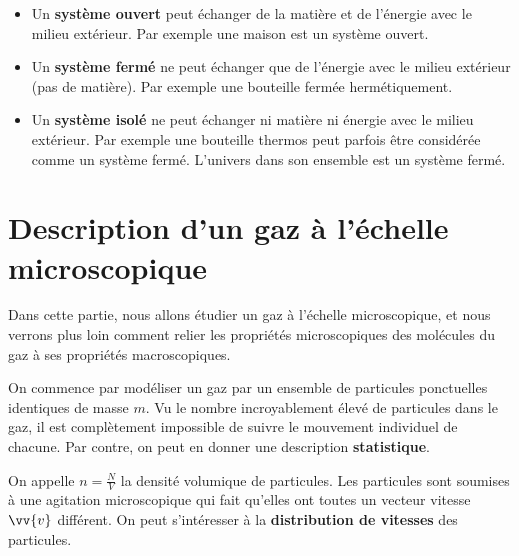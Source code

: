 \documentclass{cours}
\begin{document}
\begin{center}
\end{center}


\begin{itemize}
  \item Un \textbf{système ouvert} peut échanger de la matière et de l'énergie avec le milieu extérieur. Par exemple une maison est un système ouvert.
  \item Un \textbf{système fermé} ne peut échanger que de l'énergie avec le milieu extérieur (pas de matière). Par exemple une bouteille fermée hermétiquement.
  \item Un \textbf{système isolé} ne peut échanger ni matière ni énergie avec le milieu extérieur. Par exemple une bouteille thermos peut parfois être considérée comme un système fermé. L'univers dans son ensemble est un système fermé.
\end{itemize}

\section{Description d'un gaz à l'échelle microscopique}%
\label{sec:description_d_un_gaz_a_l_echelle_microscopique}
Dans cette partie, nous allons étudier un gaz à l'échelle microscopique, et nous verrons plus loin comment relier les propriétés microscopiques des molécules du gaz à ses propriétés macroscopiques.

On commence par modéliser un gaz par un ensemble de particules ponctuelles identiques de masse $m$. Vu le nombre incroyablement élevé de particules dans le gaz, il est complètement impossible de suivre le mouvement individuel de chacune. Par contre, on peut en donner une description \textbf{statistique}. 

On appelle $n=\frac{N}{V}$ la densité volumique de particules. Les particules sont soumises à une agitation microscopique qui fait qu'elles ont toutes un vecteur vitesse $\vv{v}$ différent. On peut s'intéresser à la \textbf{distribution de vitesses} des particules. 
\end{document}
